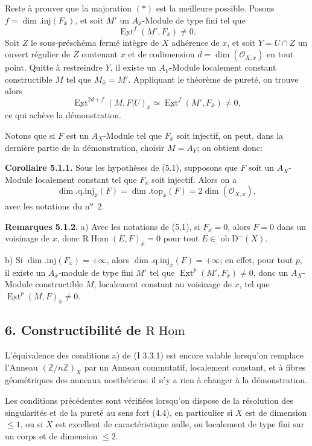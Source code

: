 \documentclass[11pt]{article}
\DeclareMathOperator{\Hom}{Hom}
\DeclareMathOperator{\Ext}{Ext}
\newcommand{\R}{\mathrm{R}}
\newcommand{\D}{\mathrm{D}}
\newcommand{\Z}{\mathbb{Z}}
\newcommand{\ob}{\operatorname{ob}}
\providecommand{\Hom}{\operatorname{Hom}}
\providecommand{\ob}{\operatorname{ob}}
\providecommand{\R}{\mathrm R}
\providecommand{\Z}{\mathbb Z}
\providecommand{\Hom}{\operatorname{Hom}}
\begin{document}
Reste à prouver que la majoration $(*)$ est la meilleure possible. Posons $f=\dim.\mathrm{inj}(F_{\bar{x}})$, et soit $M'$ un $A_{\bar{x}}$-Module de type fini tel que
\[
        \underline{\Ext}^f(M',F_{\bar{x}})\neq0.
\]
Soit $Z$ le sous-préschéma fermé intègre de $X$ adhérence de $x$, et soit $Y=U\cap Z$ un ouvert régulier de $Z$ contenant $x$ et de codimension $d=\dim(\mathcal{O}_{X,x})$ en tout point. Quitte à restreindre $Y$, il existe un $A_Y$-Module localement constant constructible $M$ tel que $M_{\bar{x}}=M'$. Appliquant le théorème de pureté, on trouve alors
\[
        \underline{\Ext}^{2d+f}(M,F|U)_{\bar{x}}\simeq \underline{\Ext}^f(M',F_{\bar{x}})\neq0,
\]
ce qui achève la démonstration.

Notons que si $F$ est un $A_X$-Module tel que $F_{\bar{x}}$ soit injectif, on peut, dans la dernière partie de la démonstration, choisir $M=A_Y$; on obtient donc:

\textbf{Corollaire 5.1.1.} Sous les hypothèses de (5.1), supposons que $F$ soit un $A_X$-Module localement constant tel que $F_{\bar{x}}$ soit injectif. Alors on a
\[
        \dim.\mathrm{q.inj}_{\bar{x}}(F)=\dim.\mathrm{top}_{\bar{x}}(F)=2\dim(\mathcal{O}_{X,x}),
\]
avec les notations du n\textsuperscript{o}~2.

\textbf{Remarques 5.1.2.} a) Avec les notations de (5.1), si $F_{\bar{x}}=0$, alors $F=0$ dans un voisinage de $x$, donc $\R\underline{\Hom}(E,F)_{\bar{x}}=0$ pour tout $E\in\ob\D^{-}(X)$.

b) Si $\dim.\mathrm{inj}(F_{\bar{x}})=+\infty$, alors $\dim.\mathrm{q.inj}_{\bar{x}}(F)=+\infty$; en effet, pour tout $p$, il existe un $A_{\bar{x}}$-module de type fini $M'$ tel que $\underline{\Ext}^p(M',F_{\bar{x}})\neq0$, donc un $A_X$-Module constructible $M$, localement constant au voisinage de $x$, tel que $\underline{\Ext}^p(M,F)_{\bar{x}}\neq0$.

\subsection*{6. Constructibilité de $\R\underline{\Hom}$}

L'équivalence des conditions a) de (I 3.3.1) est encore valable lorsqu'on remplace l'Anneau $(\Z/n\Z)_X$ par un Anneau commutatif, localement constant, et à fibres géométriques des anneaux noethériens: il n'y a rien à changer à la démonstration.

Les conditions précédentes sont vérifiées lorsqu'on dispose de la résolution des singularités et de la pureté au sens fort (4.4), en particulier si $X$ est de dimension $\leq1$, ou si $X$ est excellent de caractéristique nulle, ou localement de type fini sur un corps et de dimension $\leq2$.
\end{document}

